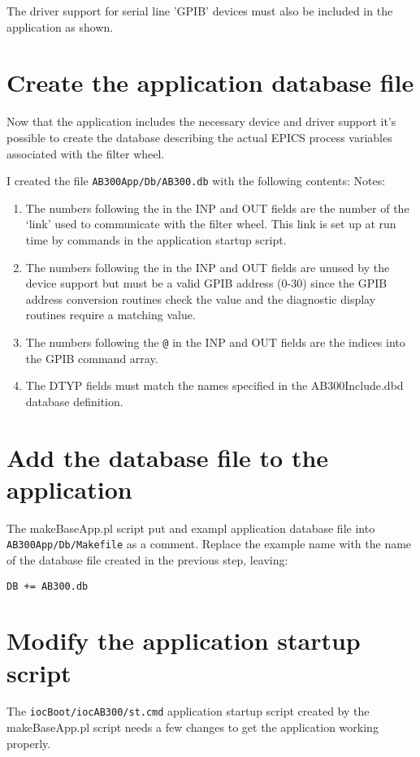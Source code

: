 \documentclass[twoside]{article}
\begin{document}
The driver support for serial line 'GPIB' devices must also be included in
the application as shown.





\section{Create the application database file}
Now that the application includes the necessary device and driver support 
it's possible to create the database describing the actual EPICS process
variables associated with the filter wheel.  

I created the file {\tt AB300App/Db/AB300.db} with the following contents:
Notes:
\begin{enumerate}
\item The numbers following the \verb@L@ in
the INP and OUT fields are the 
number of the `link' used to communicate with the filter wheel.  This
link is set up at run time by commands in the application startup script.
\item The numbers following the \verb@A@ in
the INP and OUT fields are unused by the device support but must be
a valid GPIB address (0-30) since the GPIB address conversion routines
check the value and the diagnostic display routines require a matching value.
\item The numbers following the \verb|@| in
the INP and OUT fields are the 
indices into the GPIB command array.
\item The DTYP fields must match the names specified in the AB300Include.dbd
database definition.
\end{enumerate}


\section{Add the database file to the application}
The makeBaseApp.pl script put and exampl application database file
into {\tt AB300App/Db/Makefile} as a comment.  
Replace the example name with the name of the database file created in the
previous step, leaving:
\begin{verbatim}
DB += AB300.db
\end{verbatim}



\section{Modify the application startup script}
The {\tt iocBoot/iocAB300/st.cmd} application startup script created by the
makeBaseApp.pl script needs a few changes to get the application 
working properly.
\end{document}
